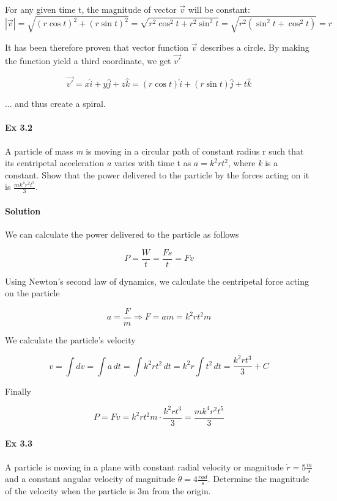 \documentclass{article}
\begin{document}
For any given time t, the magnitude of vector $\vec{v}$ will be constant:
\[ |\vec{v}| = \sqrt{(r \cos{t})^{2} + (r \sin{t})^2} = \sqrt{r^2 \cos^2{t} + r^2 \sin^2{t}} = \sqrt{r^2 (\sin^2{t} + \cos^2{t})} = r \]

It has been therefore proven that vector function $\vec{v}$ describes a circle. By making the function yield a third coordinate, we get $\vec{v'}$

\[ \vec{v'} = x \hat{i} + y \hat{j} + z \hat{k} = (r \cos{t}) \hat{i} + (r \sin{t}) \hat{j} + t \hat{k} \]

... and thus create a spiral.


\paragraph{Ex 3.2}
A particle of mass \textit{m} is moving in a circular path of constant radius r such that its centripetal acceleration \textit{a} varies with time t as $a = k^2rt^2$, where \textit{k} is a constant. Show that the power delivered to the particle by the forces acting on it is $\frac{mk^4r^2t^5}{3}$.
\paragraph{Solution}

We can calculate the power delivered to the particle as follows

\[ P = \frac{W}{t} = \frac{Fs}{t} = Fv \]

Using Newton's second law of dynamics, we calculate the centripetal force acting on the particle

\[ a = \frac{F}{m} \Rightarrow F = am  = k^2rt^2m \]

We calculate the particle's velocity

\[ v = \int{dv} = \int{a \, dt} = \int{k^2rt^2 \, dt} = k^2r \int{t^2 \, dt} = \frac{k^2rt^3}{3} + C\]

Finally

\[ P = Fv = k^2rt^2m \cdot \frac{k^2rt^3}{3} = \frac{mk^4r^2t^5}{3} \]


\paragraph{Ex 3.3}
A particle is moving in a plane with constant radial velocity or magnitude $\dot{r} = 5 \frac{m}{s}$ and a constant angular velocity of magnitude $\dot{\theta} = 4 \frac{rad}{s}$. Determine the magnitude of the velocity when the particle is 3m from the origin.
\end{document}
